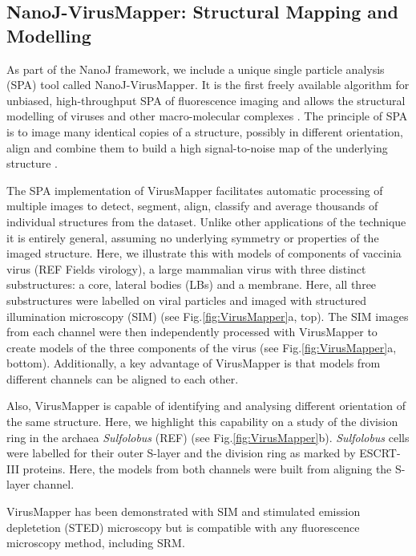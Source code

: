 \subsection*{NanoJ-VirusMapper: Structural Mapping and Modelling}
As part of the NanoJ framework, we include a unique single particle analysis (SPA) tool called NanoJ-VirusMapper. It is the first freely available algorithm for unbiased, high-throughput SPA of fluorescence imaging and allows the structural modelling of viruses and other macro-molecular complexes \cite{Gray2016,Gray2017}. The principle of SPA is to image many identical copies of a structure, possibly in different orientation, align and combine them to build a high signal-to-noise map of the underlying structure \cite{Szymborska2013,laine2015structural} . 

The SPA implementation of VirusMapper facilitates automatic processing of multiple images to detect, segment, align, classify and average thousands of individual structures from the dataset. Unlike other applications of the technique it is entirely general, assuming no underlying symmetry or properties of the imaged structure. Here, we illustrate this with models of components of vaccinia virus (REF Fields virology), a large mammalian virus with three distinct substructures: a core, lateral bodies (LBs) and a membrane. Here, all three substructures were labelled on viral particles and  imaged with structured illumination microscopy (SIM) \cite{gustafsson2000surpassing} (see Fig.\ref{fig:VirusMapper}a, top). The SIM images from each channel were then independently processed with VirusMapper to create models of the three components of the virus (see Fig.\ref{fig:VirusMapper}a, bottom). Additionally, a key advantage of VirusMapper is that models from different channels can be aligned to each other.

Also, VirusMapper is capable of identifying and analysing different orientation of the same structure. Here, we highlight this capability on a study of the division ring in the archaea \emph{Sulfolobus} (REF) (see Fig.\ref{fig:VirusMapper}b). \emph{Sulfolobus} cells were labelled for their outer S-layer and the division ring as marked by ESCRT-III proteins. Here, the models from both channels were built from aligning the S-layer channel.

VirusMapper has been demonstrated with SIM and stimulated emission depletetion (STED) microscopy \cite{Gray2016} but is compatible with any fluorescence microscopy method, including SRM.

